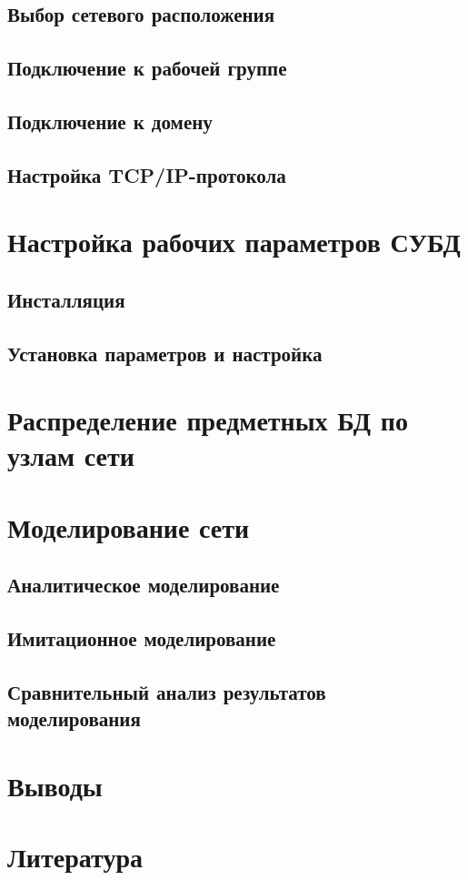 \documentclass[russian,utf8,emptystyle]{eskdtext}
\begin{document}
\subsection{Выбор сетевого расположения}
\subsection{Подключение к рабочей группе}
\subsection{Подключение к домену}
\subsection{Настройка TCP/IP-протокола}

\clearpage
\section{Настройка рабочих параметров СУБД}
\subsection{Инсталляция}
\subsection{Установка параметров и настройка}

\clearpage
\section{Распределение предметных БД по узлам сети}

\clearpage
\section{Моделирование сети}
\subsection{Аналитическое моделирование}
\subsection{Имитационное моделирование}
\subsection{Сравнительный анализ результатов моделирования}

\clearpage
\section{Выводы}

\clearpage
\section{Литература}
\end{document}
